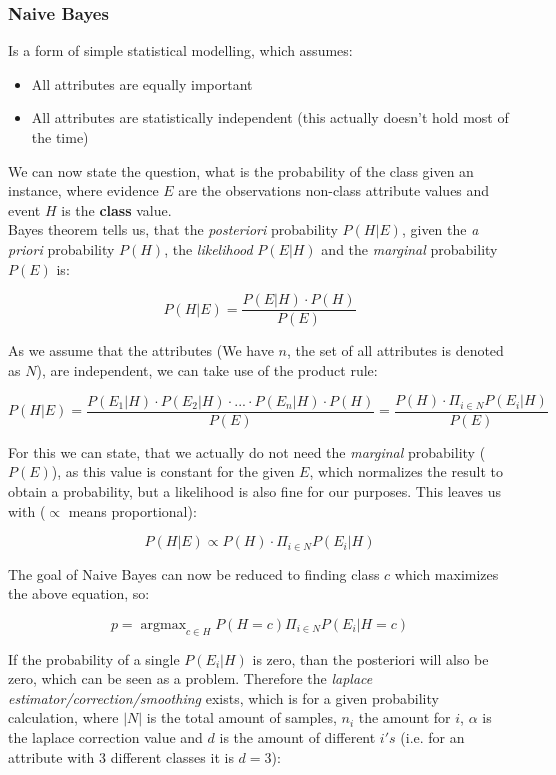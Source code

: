 \documentclass[12pt,a4paper]{article}
\DeclareMathOperator*{\argmax}{argmax}
\begin{document}
\subsubsection{Naive Bayes}
\label{subsubsec:naive-bayes}

\noindent Is a form of simple statistical modelling, which assumes:

\begin{itemize}
    \item All attributes are equally important
    \item All attributes are statistically independent (this actually doesn't hold most of the time)
\end{itemize}

\noindent We can now state the question, what is the probability of the class given an instance, where evidence \(E\) are the observations non-class attribute values and event \(H\) is the \textbf{class} value.\\
Bayes theorem tells us, that the \textit{posteriori} probability \(P(H|E)\), given the \textit{a priori} probability \(P(H)\), the \textit{likelihood} \(P(E|H)\) and the \textit{marginal} probability \(P(E)\) is:

\[P(H|E) = \frac{P(E|H) \cdot P(H)}{P(E)}\]

\noindent As we assume that the attributes (We have \(n\), the set of all attributes is denoted as \(N\)), are independent, we can take use of the product rule:

\[P(H|E) = \frac{P(E_1 | H) \cdot P(E_2 | H) \cdot ... \cdot P(E_n | H) \cdot P(H)}{P(E)} = \frac{P(H) \cdot \Pi_{i \in N} P(E_i | H)}{P(E)}\]

\noindent For this we can state, that we actually do not need the \textit{marginal} probability (\(P(E)\)), as this value is constant for the given \(E\), which normalizes the result to obtain a probability, but a likelihood is also fine for our purposes. This leaves us with (\(\propto\) means proportional):

\[P(H|E) \propto P(H) \cdot \Pi_{i \in N} P(E_i | H)\]

\noindent The goal of Naive Bayes can now be reduced to finding class \(c\) which maximizes the above equation, so:

\[p = \argmax_{c \in H} P(H = c) \Pi_{i \in N} P(E_i | H = c)\]

\noindent If the probability of a single \(P(E_i | H)\) is zero, than the posteriori will also be zero, which can be seen as a problem. Therefore the \textit{laplace estimator/correction/smoothing} exists, which is for a given probability calculation, where \(|N|\) is the total amount of samples, \(n_i\) the amount for \(i\), \(\alpha\) is the laplace correction value and \(d\) is the amount of different \(i's\) (i.e. for an attribute with 3 different classes it is \(d = 3\)):
\end{document}
